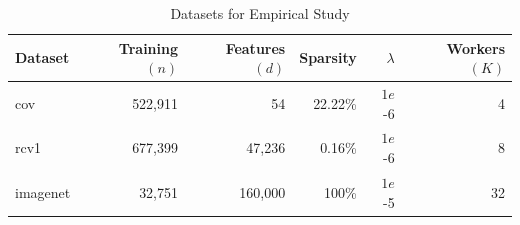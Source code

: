 \documentclass{article} %
\begin{document}
%
%
%

\begin{table}[h]
\caption{Datasets for Empirical Study \vspace{-1em}}
\label{tab:datasets}
   \begin{center}
      \begin{tabular}{l| r | %
      r | r | r | r}
       \vspace{.25em}
    {\small\textbf{Dataset}} & {\small\textbf{Training}} $(n)$ & %
    {\small\textbf{Features}} $(d)$ & {\small\textbf{Sparsity}} & {$\lambda$} & {\small\textbf{Workers}} $(K)$\\
    \hline
	cov & 522,911 & %
	  54 & 22.22\% & $1e$-6 & 4 \\
	rcv1 & 677,399 & %
	  47,236 & 0.16\% & $1e$-6 & 8 \\
	imagenet & 32,751 & %
	  160,000 & 100\%& $1e$-5 & 32 \\
      \end{tabular}
   \end{center}\vspace{-2mm}
\end{table}
\end{document}

